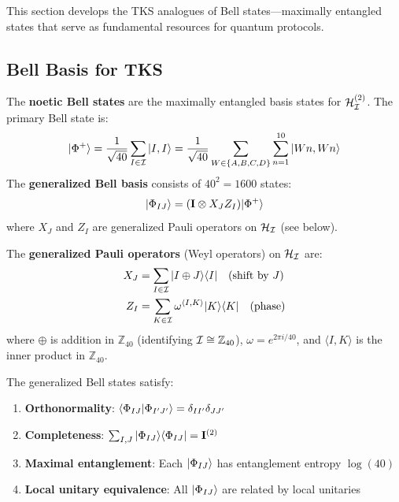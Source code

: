 This section develops the TKS analogues of Bell states---maximally entangled states that serve as fundamental resources for quantum protocols.

\subsection{Bell Basis for TKS}

\begin{definition}
\label{def:noetic-bell}
The \textbf{noetic Bell states} are the maximally entangled basis states for $\mathcal{H}_{\mathcal{I}}^{(2)}$. The primary Bell state is:
\[
|\Phi^+\rangle = \frac{1}{\sqrt{40}} \sum_{I \in \mathcal{I}} |I, I\rangle = \frac{1}{\sqrt{40}} \sum_{W \in \{A,B,C,D\}} \sum_{n=1}^{10} |Wn, Wn\rangle
\]
The \textbf{generalized Bell basis} consists of $40^2 = 1600$ states:
\[
|\Phi_{IJ}\rangle = (\mathbf{I} \otimes X_J Z_I) |\Phi^+\rangle
\]
where $X_J$ and $Z_I$ are generalized Pauli operators on $\mathcal{H}_{\mathcal{I}}$ (see below).
\end{definition}

\begin{definition}
\label{def:generalized-pauli}
The \textbf{generalized Pauli operators} (Weyl operators) on $\mathcal{H}_{\mathcal{I}}$ are:
\begin{align}
X_J &= \sum_{I \in \mathcal{I}} |I \oplus J\rangle\langle I| \quad \text{(shift by $J$)} \\
Z_I &= \sum_{K \in \mathcal{I}} \omega^{\langle I, K \rangle} |K\rangle\langle K| \quad \text{(phase)}
\end{align}
where $\oplus$ is addition in $\mathbb{Z}_{40}$ (identifying $\mathcal{I} \cong \mathbb{Z}_{40}$), $\omega = e^{2\pi i / 40}$, and $\langle I, K \rangle$ is the inner product in $\mathbb{Z}_{40}$.
\end{definition}

\begin{proposition}
\label{prop:bell-basis}
The generalized Bell states satisfy:
\begin{enumerate}
  \item \textbf{Orthonormality}: $\langle \Phi_{IJ}|\Phi_{I'J'}\rangle = \delta_{II'} \delta_{JJ'}$
  \item \textbf{Completeness}: $\sum_{I, J} |\Phi_{IJ}\rangle\langle \Phi_{IJ}| = \mathbf{I}^{(2)}$
  \item \textbf{Maximal entanglement}: Each $|\Phi_{IJ}\rangle$ has entanglement entropy $\log(40)$
  \item \textbf{Local unitary equivalence}: All $|\Phi_{IJ}\rangle$ are related by local unitaries
\end{enumerate}
\end{proposition}

